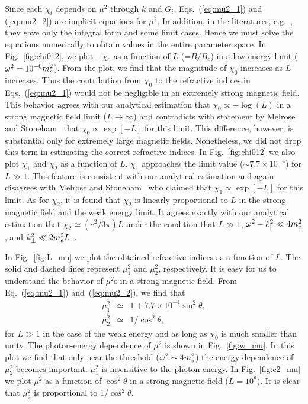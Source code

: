 Since each $\chi_i$ depends on $\mu^2$ through $k$ and $G_i$,
Eqs.~(\ref{eq:mu2_1}) and (\ref{eq:mu2_2}) are implicit equations for
$\mu^2$. In addition, in the literatures,
e.g.~\cite{melrose_stoneham}, they gave only the integral form and
some limit cases. Hence we must solve the equations numerically to
obtain values in the entire parameter space.  In
Fig.~\ref{fig:chi012}, we plot $- \chi_0$ as a function of $L$
(=$B/B_c$) in a low energy limit ($\omega^2 = 10^{-6} m_e^2$). From
the plot, we find that the magnitude of $\chi_0$ increases as $L$
increases. Thus the contribution from $\chi_0$ to the refractive
indices in Eqs.~(\ref{eq:mu2_1}) would not be negligible in an
extremely strong magnetic field. This behavior agrees with our
analytical estimation that $\chi_0 \propto - \log(L)$ in a strong
magnetic field limit ($L \to \infty$) and contradicts with statement
by Melrose and Stoneham~\cite{melrose_stoneham} that $\chi_0 \propto
\exp[-L]$ for this limit. This difference, however, is substantial only
for extremely large magnetic fields. Nonetheless, we did not drop this
term in estimating the correct refractive indices. In
Fig.~\ref{fig:chi012} we also plot $\chi_1$ and $\chi_2$ as a function
of $L$. $\chi_1$ approaches the limit value ($\sim 7.7 \times
10^{-4}$) for $L \gg 1$. This feature is consistent with our
analytical estimation and again disagrees with Melrose and
Stoneham~\cite{melrose_stoneham} who claimed that $\chi_1 \propto
\exp[-L]$ for this limit. As for $\chi_2$, it is found that $\chi_2$
is linearly proportional to $L$ in the strong magnetic field and the
weak energy limit. It agrees exactly with our analytical estimation
that $\chi_2 \simeq \left(e^2/3\pi\right) L$ under the condition that
$L \gg 1$, $\omega^2 - k_{\parallel}^2 \ll 4m_e^2$, and $k_{\perp}^2 \ll
2m_e^2L$~\cite{melrose_stoneham}.

In Fig.~\ref{fig:L_mu} we plot the obtained refractive indices as a
function of $L$.  The solid and dashed lines represent $\mu^2_1$ and 
$\mu^2_2$, respectively. It is easy for us to understand the
behavior of $\mu^2$s in a strong magnetic field. From
Eq.~(\ref{eq:mu2_1}) and~(\ref{eq:mu2_2}), we find that
\begin{eqnarray}
    \label{eq:mu_L_limit_1}
    \mu^2_1 &\simeq& 1 + 7.7 \times 10^{-4} \sin ^{2} \theta, \\
    \label{eq:mu_L_limit_2}
    \mu^2_2 &\simeq& 1/\cos^2\theta,
\end{eqnarray}
for $L \gg 1$ in the case of the weak energy and as long as $\chi_0$ is 
much smaller than unity. The photon-energy
dependence of $\mu^2$ is shown in Fig.~\ref{fig:w_mu}. In this plot we
find that only near the threshold ($\omega^2 \sim 4m_e^2$) the energy
dependence of $\mu^2_2$ becomes important. $\mu^2_1$ is insensitive to the
photon energy. In Fig.~\ref{fig:c2_mu} we plot $\mu^2$ as a function
of $\cos^2\theta$ in a strong magnetic field ($L = 10^8$). It is clear
that $\mu_2^2$ is proportional to 1/$\cos^2\theta$.

